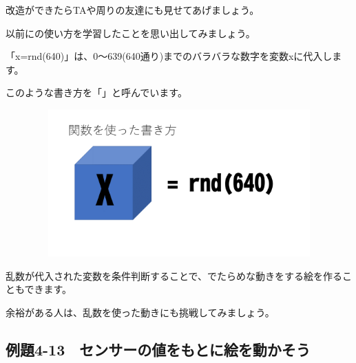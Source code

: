 改造ができたらTAや周りの友達にも見せてあげましょう。


以前にの使い方を学習したことを思い出してみましょう。

「x=rnd(640)」は、0〜639(640通り)までのバラバラな数字を変数xに代入します。

このような書き方を「」と呼んでいます。

\begin{figure}[H]
    \begin{center}
      \includegraphics[keepaspectratio,width=11.906cm,height=5.662cm]{text04-img/s_rnd.png}
    \end{center}
    \label{fig:prog_menu}
\end{figure}

\begin{description}
    \item {}
    \item {}
    \item {}
\end{description}

乱数が代入された変数を条件判断することで、でたらめな動きをする絵を作ることもできます。

余裕がある人は、乱数を使った動きにも挑戦してみましょう。

\newpage
\subsection{例題4-13　センサーの値をもとに絵を動かそう}

\begin{description}
    \item {}
\end{description}

